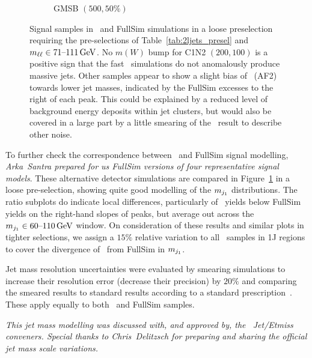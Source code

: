 \begin{figure}[tp]
\begin{subfigure}{0.48\textwidth}
\caption{GMSB $(500, 50\%)$}
\end{subfigure}
\caption[
Signal samples in \afii\ and FullSim simulations in a loose preselection
]{%
Signal samples in \afii\ and FullSim simulations in a loose preselection
requiring the pre-selections of Table~\ref{tab:2ljets_presel} and
$\mll \in 71\textrm{--}111\,\eV[G]$.
No $m(W)$ bump for C1N2 $(200, 100)$ is a positive sign that the fast \afii\
simulations do not anomalously produce massive jets.
Other samples appear to show a slight bias of \afii\ (AF2) towards lower jet
masses, indicated by the FullSim excesses to the right of each peak.
This could be explained by a reduced level of background energy deposits within
jet clusters, but would also be covered in a large part by a little smearing of
the \afii\ result to describe other noise.
}
\label{fig:2ljets_jetm_afii_fullsim}
\end{figure}

To further check the correspondence between \afii\ and FullSim signal modelling,
\emph{Arka~Santra prepared for us FullSim versions of four representative
signal models}.
These alternative detector simulations are compared in
Figure~\ref{fig:2ljets_jetm_afii_fullsim} in a loose pre-selection,
showing quite good modelling of the $\mjetone$ distributions.
The ratio subplots do indicate local differences, particularly of \afii\ yields
below FullSim yields on the right-hand slopes of peaks, but average out
across the $\mjetone \in 60\textrm{--}110\,\eV[G]$ window.
On consideration of these results and similar plots in tighter selections,
we assign a $15\%$ relative variation to all \afii\ samples in 1J regions
to cover the divergence of \afii\ from FullSim in $\mjetone$.

Jet mass resolution uncertainties were evaluated by smearing simulations
to increase their resolution error (decrease their precision) by $20\%$
and comparing the smeared results to standard results according to a standard
prescription~\cite{atlas_twiki_jmr}.
These apply equally to both \afii\ and FullSim samples.

\emph{This jet mass modelling was discussed with, and approved by, the \atlas\
Jet/Etmiss conveners. Special thanks to Chris~Delitzsch for preparing and
sharing the official jet mass scale variations.}


